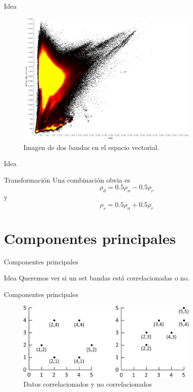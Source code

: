 \documentclass[]{beamer}
\begin{document}
\begin{frame}{Idea}
  \begin{figure}
  \centering
  \includegraphics[width=0.8\textwidth]{imagenes/nir-red2.png}
  \caption{Imagen de dos bandas en el espacio vectorial.}
  \end{figure}
\end{frame}

\begin{frame}{Idea}
  \begin{alertblock}{Transformación}
    Una combinación obvia es $$ \rho_d = 0.5\rho_n-0.5\rho_r$$
    y
    $$ \rho_s = 0.5\rho_n+0.5\rho_r $$
  \end{alertblock}
\end{frame}


\section{Componentes principales}
\begin{frame}{Componentes principales}
  \begin{block}{Idea}
    Queremos ver si un set bandas está correlacionadas o no.
  \end{block}
\end{frame}

\begin{frame}{Componentes principales}
  \begin{figure}
  \centering
  \includegraphics[width=0.8\textwidth]{imagenes/corr.png}
  \caption{Datos correlacionados y no correlacionados}
  \end{figure}
\end{frame}
\end{document}
